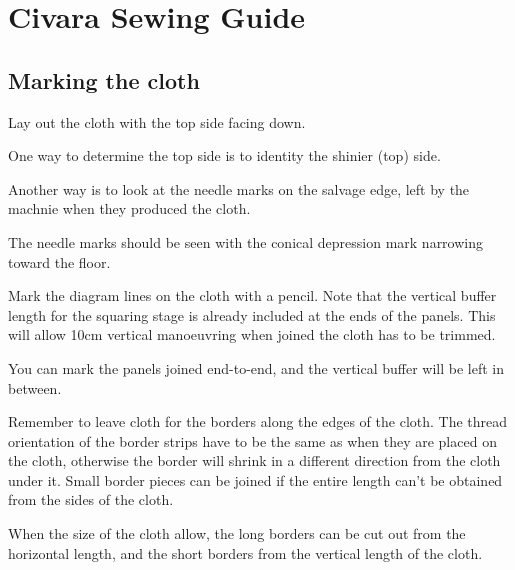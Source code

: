 \chapter{Civara Sewing Guide}

\section{Marking the cloth}

Lay out the cloth with the top side facing down.

One way to determine the top side is to identity the shinier (top) side.

Another way is to look at the needle marks on the salvage edge, left by
the machnie when they produced the cloth.

The needle marks should be seen with the conical depression mark
narrowing toward the floor.

\begin{multicols}{2}
\setlength{\nextPhotoWidth}{\linewidth}


\columnbreak

Mark the diagram lines on the cloth with a pencil. Note that the
vertical buffer length for the squaring stage is already included at the
ends of the panels. This will allow 10cm vertical manoeuvring when
joined the cloth has to be trimmed.

You can mark the panels joined end-to-end, and the vertical buffer will
be left in between.

\end{multicols}

\clearpage



Remember to leave cloth for the borders along the edges of the cloth.
The thread orientation of the border strips have to be the same as when
they are placed on the cloth, otherwise the border will shrink in a
different direction from the cloth under it. Small border pieces can be
joined if the entire length can't be obtained from the sides of the
cloth.

When the size of the cloth allow, the long borders can be cut out from
the horizontal length, and the short borders from the vertical length of
the cloth.


